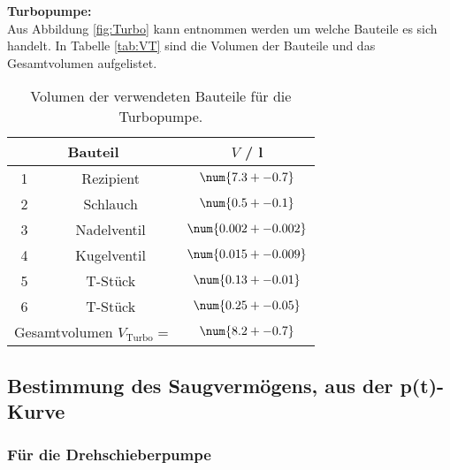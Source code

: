 \textbf{Turbopumpe:} \\
Aus Abbildung \eqref{fig:Turbo} kann entnommen werden um welche Bauteile es sich handelt. In Tabelle \eqref{tab:VT} sind die Volumen der Bauteile und das Gesamtvolumen aufgelistet.

\begin{table} %
  \centering
  \caption{Volumen der verwendeten Bauteile für die Turbopumpe.}
  \label{tab:VT}
  \begin{tabular}{c|c|c}
    \multicolumn{2}{c|}{Bauteil} & $V$ / l \\
    \hline
    1 & Rezipient & $\num{7.3 +- 0.7}$ \\
    2 & Schlauch & $\num{0.5 +- 0.1}$ \\
    3 & Nadelventil & $\num{0.002 +- 0.002}$ \\
    4 & Kugelventil & $\num{0.015 +- 0.009}$ \\
    5 & T-Stück & $\num{0.13 +- 0.01}$ \\
    6 & T-Stück & $\num{0.25 +- 0.05}$ \\
    \hline
    \multicolumn{2}{c}{Gesamtvolumen $V_\text{Turbo} =$} & $\num{8.2 +- 0.7}$ \\
  \end{tabular}
\end{table}



\subsection{Bestimmung des Saugvermögens, aus der p(t)-Kurve}

\subsubsection{Für die Drehschieberpumpe}

